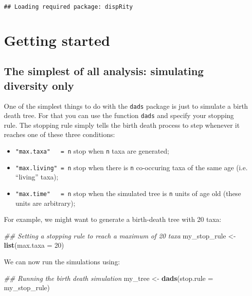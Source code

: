 \documentclass[]{book}
\newenvironment{Shaded}{\begin{snugshade}}{\end{snugshade}}
\newcommand{\CommentTok}[1]{\textcolor[rgb]{0.56,0.35,0.01}{\textit{#1}}}
\newcommand{\DataTypeTok}[1]{\textcolor[rgb]{0.13,0.29,0.53}{#1}}
\newcommand{\DecValTok}[1]{\textcolor[rgb]{0.00,0.00,0.81}{#1}}
\newcommand{\KeywordTok}[1]{\textcolor[rgb]{0.13,0.29,0.53}{\textbf{#1}}}
\newcommand{\NormalTok}[1]{#1}
\newcommand{\StringTok}[1]{\textcolor[rgb]{0.31,0.60,0.02}{#1}}
\providecommand{\tightlist}{%
  \setlength{\itemsep}{0pt}\setlength{\parskip}{0pt}}
\begin{document}
\begin{verbatim}
## Loading required package: dispRity
\end{verbatim}

\hypertarget{getting-started}{%
\chapter{Getting started}\label{getting-started}}

\hypertarget{the-simplest-of-all-analysis-simulating-diversity-only}{%
\section{The simplest of all analysis: simulating diversity only}\label{the-simplest-of-all-analysis-simulating-diversity-only}}

One of the simplest things to do with the \texttt{dads} package is just to simulate a birth death tree.
For that you can use the function \texttt{dads} and specify your stopping rule.
The stopping rule simply tells the birth death process to step whenever it reaches one of these three conditions:

\begin{itemize}
\tightlist
\item
  \texttt{"max.taxa"\ \ \ =\ n} stop when \texttt{n} taxa are generated;
\item
  \texttt{"max.living"\ =\ n} stop when there is \texttt{n} co-occuring taxa of the same age (i.e. ``living'' taxa);
\item
  \texttt{"max.time"\ \ \ =\ n} stop when the simulated tree is \texttt{n} units of age old (these units are arbitrary);
\end{itemize}

For example, we might want to generate a birth-death tree with 20 taxa:

\begin{Shaded}
\begin{Highlighting}[]
\CommentTok{## Setting a stopping rule to reach a maximum of 20 taxa}
\NormalTok{my_stop_rule <-}\StringTok{ }\KeywordTok{list}\NormalTok{(}\DataTypeTok{max.taxa =} \DecValTok{20}\NormalTok{)}
\end{Highlighting}
\end{Shaded}

We can now run the simulations using:

\begin{Shaded}
\begin{Highlighting}[]
\CommentTok{## Running the birth death simulation}
\NormalTok{my_tree <-}\StringTok{ }\KeywordTok{dads}\NormalTok{(}\DataTypeTok{stop.rule =}\NormalTok{ my_stop_rule)}
\end{Highlighting}
\end{Shaded}
\end{document}
